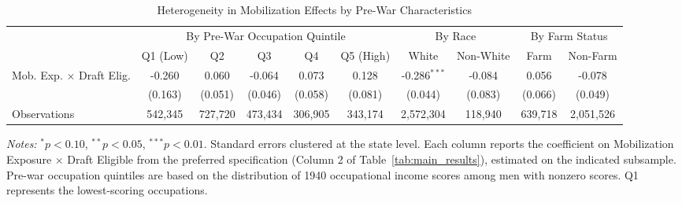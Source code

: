 \begin{table}[htbp]
\centering
\caption{Heterogeneity in Mobilization Effects by Pre-War Characteristics}
\label{tab:heterogeneity}
\begin{adjustbox}{max width=\textwidth}
\begin{tabular}{lccccccccc}
\toprule
 & \multicolumn{5}{c}{By Pre-War Occupation Quintile} & \multicolumn{2}{c}{By Race} & \multicolumn{2}{c}{By Farm Status} \\
\cmidrule(lr){2-6} \cmidrule(lr){7-8} \cmidrule(lr){9-10}
 & Q1 (Low) & Q2 & Q3 & Q4 & Q5 (High) & White & Non-White & Farm & Non-Farm \\
\midrule
Mob. Exp. $\times$ Draft Elig. & -0.260 & 0.060 & -0.064 & 0.073 & 0.128 & -0.286$^{***}$ & -0.084 & 0.056 & -0.078 \\
 & (0.163) & (0.051) & (0.046) & (0.058) & (0.081) & (0.044) & (0.083) & (0.066) & (0.049) \\
\midrule
Observations & 542,345 & 727,720 & 473,434 & 306,905 & 343,174 & 2,572,304 & 118,940 & 639,718 & 2,051,526 \\
\bottomrule
\end{tabular}
\end{adjustbox}
\begin{tablenotes}
\small
\item \textit{Notes:} $^{*}p<0.10$, $^{**}p<0.05$, $^{***}p<0.01$. Standard errors clustered at the state level. Each column reports the coefficient on Mobilization Exposure $\times$ Draft Eligible from the preferred specification (Column 2 of Table~\ref{tab:main_results}), estimated on the indicated subsample. Pre-war occupation quintiles are based on the distribution of 1940 occupational income scores among men with nonzero scores. Q1 represents the lowest-scoring occupations.
\end{tablenotes}
\end{table}
